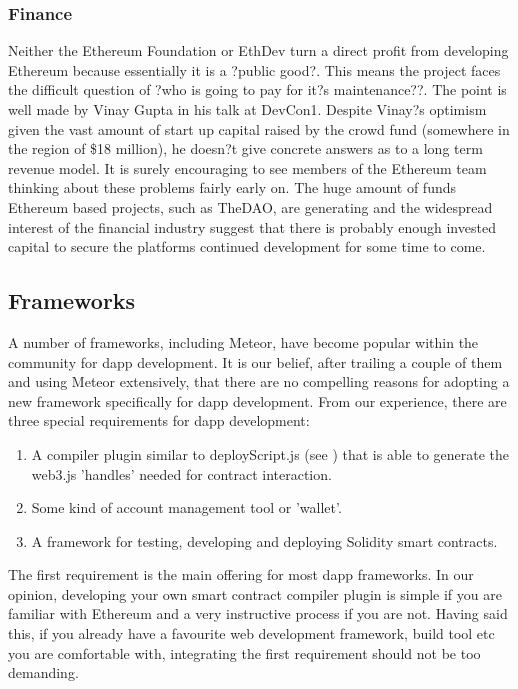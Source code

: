 \subsubsection{Finance}
Neither the Ethereum Foundation or EthDev turn a direct profit from developing Ethereum because essentially it is a ?public good?. This means the project faces the difficult question of ?who is going to pay for it?s maintenance??. The point is well made by Vinay Gupta in his talk at DevCon1\cite{GuptaFinance}. Despite Vinay?s optimism given the vast amount of start up capital raised by the crowd fund (somewhere in the region of \$18 million), he doesn?t give concrete answers as to a long term revenue model. It is surely encouraging to see members of the Ethereum team thinking about these problems fairly early on. The huge amount of funds Ethereum based projects, such as TheDAO, are generating and the widespread interest of the financial industry suggest that there is probably enough invested capital to secure the platforms continued development for some time to come.

\subsection{Frameworks}
A number of frameworks, including Meteor, have become popular within the community for dapp development. It is our belief, after trailing a couple of them and using Meteor extensively, that there are no compelling reasons for adopting a new framework specifically for dapp development. From our experience, there are three special requirements for dapp development:

\begin{enumerate}
\item A compiler plugin similar to deployScript.js (see ) that is able to generate the web3.js 'handles' needed for contract interaction.
\item Some kind of account management tool or 'wallet'.
\item A framework for testing, developing and deploying Solidity smart contracts. 
\end{enumerate}

The first requirement is the main offering for most dapp frameworks. In our opinion, developing your own smart contract compiler plugin is simple if you are familiar with Ethereum and a very instructive process if you are not. Having said this, if you already have a favourite web development framework, build tool etc you are comfortable with, integrating the first requirement should not be too demanding.\\

